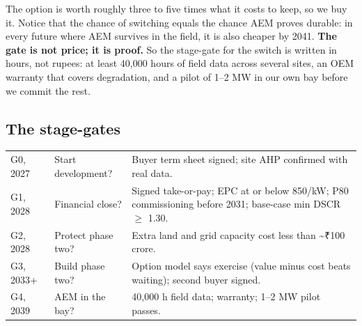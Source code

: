 \begin{verdict}
The option is worth roughly three to five times what it costs to keep, so we buy it. Notice that the chance of switching equals the chance AEM proves durable: in every future where AEM survives in the field, it is also cheaper by 2041. \textbf{The gate is not price; it is proof.} So the stage-gate for the switch is written in hours, not rupees: at least 40,000 hours of field data across several sites, an OEM warranty that covers degradation, and a pilot of 1--2 MW in our own bay before we commit the rest. \confM
\end{verdict}

\subsection{The stage-gates}
\begin{center}\tablefont
\begin{tabularx}{\textwidth}{@{}P{20mm} L L@{}}
\toprule
{} &  & \\ \midrule
G0, 2027 & Start development? & Buyer term sheet signed; site AHP confirmed with real data.\\
G1, 2028 & Financial close? & Signed take-or-pay; EPC at or below \usd{}850/kW; P80 commissioning before 2031; base-case min DSCR $\geq$ 1.30.\\
G2, 2028 & Protect phase two? & Extra land and grid capacity cost less than \textasciitilde ₹100 crore.\\
G3, 2033+ & Build phase two? & Option model says exercise (value minus cost beats waiting); second buyer signed.\\
G4, 2039 & AEM in the bay? & 40,000 h field data; warranty; 1--2 MW pilot passes.\\
\bottomrule
\end{tabularx}
\end{center}
\newpage
